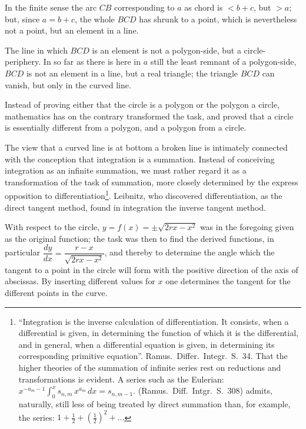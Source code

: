 \documentclass[12pt]{book}
\begin{document}
In the finite sense the arc $CB$ corresponding to $a$ as chord is $< b + c$, but
$> a$; but, since $a = b + c$, the whole $BCD$ has shrunk to a point, which is
nevertheless not a point, but an element in a line.

The line in which $BCD$ is an element is not a polygon-side, but a circle-periphery.
In so far as there is here in $a$ still the least remnant of a polygon-side, $BCD$ is
not an element in a line, but a real triangle; the triangle $BCD$ can vanish, but only
in the curved line.

Instead of proving either that the circle is a polygon or the polygon a circle,
mathematics has on the contrary transformed the task, and proved that a circle is
essentially different from a polygon, and a polygon from a circle.

The view that a curved line is at bottom a broken line is intimately connected with
the conception that integration is a summation. Instead of conceiving integration as
an infinite summation, we must rather regard it as a transformation of the task of
summation, more closely determined by the express opposition to
differentiation\footnote{``Integration is the inverse calculation of differentiation.
It consists, when a differential is given, in determining the function of which it is
the differential, and in general, when a differential equation is given, in
determining its corresponding primitive equation''. Ramus.\ Differ.\ Integr.\ S.\ 34.
That the higher theories of the summation of infinite series rest on reductions and
transformations is evident. A series such as the Eulerian:
$x^{-a_{m}-1}\int_{0}^{x} s_{n,m}\,x^{a_{m}}\,dx = s_{n,m-1}$. (Ramus.\ Diff.\
Intgr.\ S.\ 308) admits, naturally, still less of being treated by direct summation
than, for example, the series:
$1 + \frac{1}{2} + \left(\frac{1}{2}\right)^{2} + \dots$}.
Leibnitz, who discovered differentiation, as the direct tangent method, found in
integration the inverse tangent method.

With respect to the circle, $y = f(x) = \pm\sqrt{2rx - x^{2}}$ was in the foregoing
given as the original function; the task was then to find the derived functions,
in particular $\dfrac{dy}{dx} = \dfrac{r - x}{\sqrt{2rx - x^{2}}}$, and thereby to determine
the angle which the tangent to a point in the circle will form with the positive
direction of the axis of abscissas. By inserting different values for $x$ one
determines the tangent for the different points in the curve.
\end{document}
